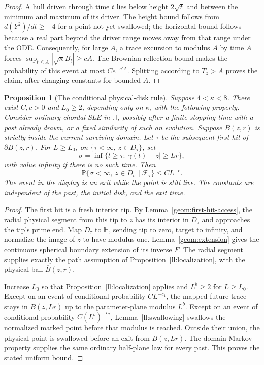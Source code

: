 \documentclass[11pt]{article}
\newtheorem{proposition}[theorem]{Proposition}
\theoremstyle{definition}
\theoremstyle{remark}
\numberwithin{equation}{section}
\begin{document}
\begin{proof}
A hull driven through time $t$ lies below height $2\sqrt t$ and
between the minimum and maximum of its driver. The height bound
follows from $d(Y^2)/dt\ge-4$ for a point not yet swallowed;
the horizontal bound follows because a real part beyond the driver
range moves away from that range under the ODE. Consequently, for
large $A$, a trace excursion to modulus $A$ by time $A$ forces
$\sup_{t\le A}|\sqrt\kappa B_t|\ge cA$.
The Brownian reflection bound makes the probability of this event
at most $Ce^{-c'A}$. Splitting according to $T_z>A$ proves the
claim, after changing constants for bounded $A$.
\end{proof}

\begin{proposition}[The conditional physical-disk rule]
\label{ll:disk-rule}
Suppose $4<\kappa<8$. There exist $C,c>0$ and $L_0\ge2$, depending only
on $\kappa$, with the following property. Consider ordinary chordal SLE
in $\mathbb H$,
possibly after a finite stopping time with a past already drawn,
or a fixed similarity of such an evolution. Suppose
$\overline B(z,r)$ is strictly inside the current surviving domain.
Let $\tau$ be the subsequent first hit of $\partial B(z,r)$.
For $L\ge L_0$, on $\{\tau<\infty,\ z\in D_\tau\}$, set
\[
 \sigma=\inf\{t\ge\tau:|\gamma(t)-z|\ge Lr\},
\]
with value infinity if there is no such time. Then
\[
 \mathbb P\{\sigma<\infty,\ z\in D_\sigma
                    \mid\mathcal F_\tau\}\le CL^{-c}.
\]
The event in the display is an exit while the point is still live.
The constants are independent of the past, the initial disk, and the exit
time.
\end{proposition}

\begin{proof}
The first hit is a fresh interior tip. By
Lemma~\ref{geom:first-hit-access}, the radial physical segment from
this tip to $z$ has its interior in $D_\tau$ and approaches the
tip's prime end. Map $D_\tau$ to $\mathbb H$, sending tip to zero,
target to infinity, and normalize the image of $z$ to have modulus
one. Lemma~\ref{geom:extension} gives the continuous spherical
boundary extension of its inverse $F$. The radial segment supplies
exactly the path assumption of Proposition~\ref{ll:localization},
with the physical ball $\overline B(z,r)$.

Increase $L_0$ so that Proposition~\ref{ll:localization} applies and
$L^b\ge2$ for $L\ge L_0$.  Except on an event of conditional probability
$CL^{-c_1}$, the
mapped future trace stays in $B(z,Lr)$ up to the parameter-plane
modulus $L^b$. Except on an event of conditional probability
$C(L^b)^{-c_2}$, Lemma~\ref{ll:swallowing} swallows the normalized
marked point before that modulus is reached. Outside their union,
the physical point is swallowed before an exit from $B(z,Lr)$.
The domain Markov property supplies the same ordinary half-plane
law for every past. This proves the stated uniform bound.
\end{proof}
\end{document}
